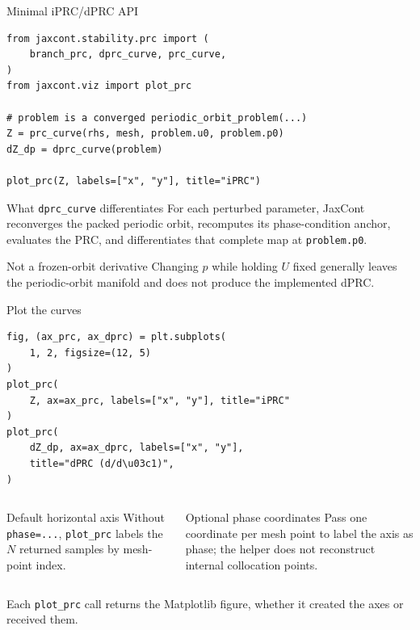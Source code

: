 \begin{frame}[fragile]{Minimal iPRC/dPRC API}
\begin{lstlisting}
from jaxcont.stability.prc import (
    branch_prc, dprc_curve, prc_curve,
)
from jaxcont.viz import plot_prc

# problem is a converged periodic_orbit_problem(...)
Z = prc_curve(rhs, mesh, problem.u0, problem.p0)
dZ_dp = dprc_curve(problem)

plot_prc(Z, labels=["x", "y"], title="iPRC")
\end{lstlisting}
\vspace{-2mm}
\begin{block}{What \texttt{dprc\_curve} differentiates}
For each perturbed parameter, JaxCont reconverges the packed periodic orbit, recomputes its phase-condition anchor, evaluates the PRC, and differentiates that complete map at \texttt{problem.p0}.
\end{block}
\begin{alertblock}{Not a frozen-orbit derivative}
Changing $p$ while holding $U$ fixed generally leaves the periodic-orbit manifold and does not produce the implemented dPRC.
\end{alertblock}
\end{frame}

\begin{frame}[fragile]{Plot the curves}
\begin{lstlisting}
fig, (ax_prc, ax_dprc) = plt.subplots(
    1, 2, figsize=(12, 5)
)
plot_prc(
    Z, ax=ax_prc, labels=["x", "y"], title="iPRC"
)
plot_prc(
    dZ_dp, ax=ax_dprc, labels=["x", "y"],
    title="dPRC (d/d\u03c1)",
)
\end{lstlisting}
\vspace{-2mm}
\begin{columns}[T,onlytextwidth]
\begin{block}{Default horizontal axis}
Without \texttt{phase=...}, \texttt{plot\_prc} labels the $N$ returned samples by mesh-point index.
\end{block}
\begin{block}{Optional phase coordinates}
Pass one coordinate per mesh point to label the axis as phase; the helper does not reconstruct internal collocation points.
\end{block}
\end{columns}
\vspace{2mm}
{\small Each \texttt{plot\_prc} call returns the Matplotlib figure, whether it created the axes or received them.}
\end{frame}

